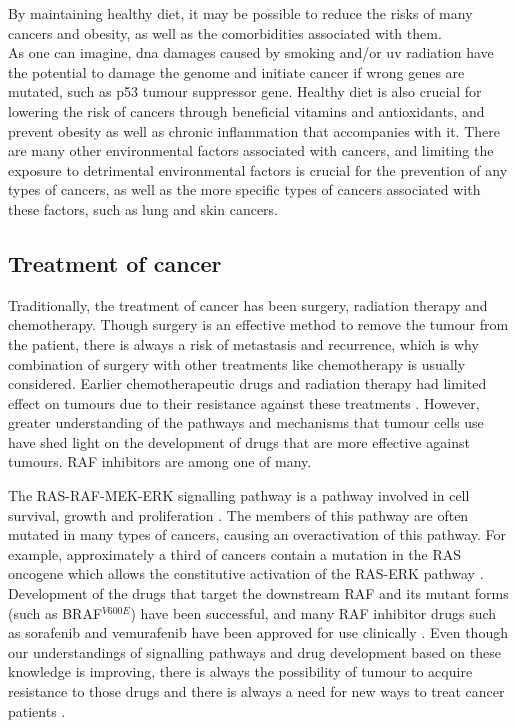 By maintaining healthy diet, it may be possible to reduce the risks of many cancers and obesity, as well as the comorbidities associated with them.
\\

\noindent
As one can imagine, \acrshort{dna} damages caused by smoking and/or \gls{uv} radiation have the potential to damage the genome and initiate cancer if wrong genes are mutated, such as p53 tumour suppressor gene.
Healthy diet is also crucial for lowering the risk of cancers through beneficial vitamins and antioxidants, and prevent obesity as well as chronic inflammation that accompanies with it.
There are many other environmental factors associated with cancers, and limiting the exposure to detrimental environmental factors is crucial for the prevention of any types of cancers, as well as the more specific types of cancers associated with these factors, such as lung and skin cancers.
\\

\subsection{Treatment of cancer}
\label{sub:treatment_of_cancer}

Traditionally, the treatment of cancer has been surgery, radiation therapy and chemotherapy.
Though surgery is an effective method to remove the tumour from the patient, there is always a risk of metastasis and recurrence, which is why combination of surgery with other treatments like chemotherapy is usually considered.
Earlier chemotherapeutic drugs and radiation therapy had limited effect on tumours due to their resistance against these treatments \citep{Wilhelm2006}.
However, greater understanding of the pathways and mechanisms that tumour cells use have shed  light on the development of drugs that are more effective against tumours.
RAF inhibitors are among one of many.

The RAS-RAF-MEK-ERK signalling pathway is a pathway involved in cell survival, growth and proliferation \citep{Samatar2014,Wilhelm2006}.
The members of this pathway are often mutated in many types of cancers, causing an overactivation of this pathway.
For example, approximately a third of cancers contain a mutation in the RAS oncogene which allows the constitutive activation of the RAS-ERK pathway \citep{Samatar2014}.
Development of the drugs that target  the downstream RAF and its mutant forms (such as BRAF$^{V600E}$) have been successful, and many RAF inhibitor drugs such as sorafenib and vemurafenib have been approved for use clinically \citep{Samatar2014,Wilhelm2006}.
Even though our understandings of signalling pathways and drug development based on these knowledge is improving, there is always the possibility of tumour to acquire resistance to those drugs and there is always a need for new ways to treat cancer patients \citep{Samatar2014}.

